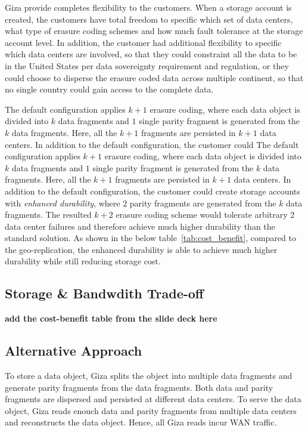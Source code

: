 Giza provide completes flexibility to the customers. When a storage account is created, the customers have total freedom to specific which set of data centers, what type of erasure coding schemes and how much fault tolerance at the storage account level. In addition, the customer had additional flexibility to specific which data centers are involved, so that they could constraint all the data to be in the United States per data sovereignty requirement and regulation, or they could choose to disperse the erasure coded data across multiple continent, so that no single country could gain access to the complete data.

The default configuration applies $k+1$ erasure coding, where each data object is divided into $k$ data fragments and $1$ single parity fragment is generated from the $k$ data fragments. Here, all the $k+1$ fragments are persisted in $k+1$ data centers. In addition to the default configuration, the customer could 
The default configuration applies $k+1$ erasure coding, where each data object is divided into $k$ data fragments and $1$ single parity fragment is generated from the $k$ data fragments. Here, all the $k+1$ fragments are persisted in $k+1$ data centers. In addition to the default configuration, the customer could create storage accounts with {\em enhanced durability}, where 2 parity fragments are generated from the $k$ data fragments. The resulted $k+2$ erasure coding scheme would tolerate arbitrary 2 data center failures and therefore achieve much higher durability than the standard solution. As shown in the below table~\ref{tab:cost_benefit}, compared to the geo-replication, the enhanced durability is able to achieve much higher durability while still reducing storage cost.

\subsection{Storage & Bandwdith Trade-off}

{\bf add the cost-benefit table from the slide deck here}

\subsection{Alternative Approach}

To store a data object, Giza splits the object into multiple data fragments and generate parity fragments from the data fragments. Both data and parity fragments are dispersed and persisted at different data centers. To serve the data object, Giza reads enouch data and parity fragments from multiple data centers and reconstructs the data object. Hence, all Giza reads incur WAN traffic.

